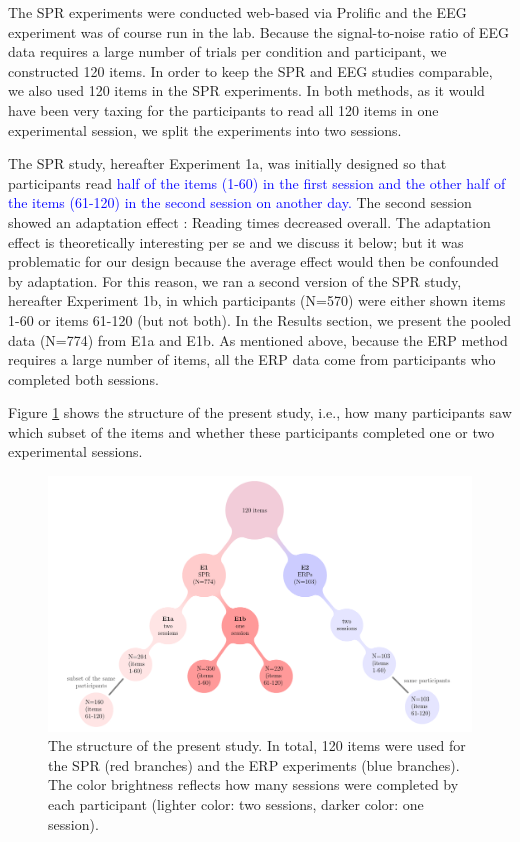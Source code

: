 \documentclass[review,preprint,12pt,authoryear,floatsintext]{elsarticle}
\begin{document}
The SPR experiments were conducted web-based via Prolific and the EEG experiment was of course run in the lab.  Because the signal-to-noise ratio of EEG data requires a large number of trials per condition and participant, we constructed 120 items. In order to keep the SPR and EEG studies comparable, we also used 120 items in the SPR experiments. In both methods, as it would have been very taxing for the participants to read all 120 items in one experimental session, we split the experiments into two sessions. 

The SPR study, hereafter Experiment 1a, was initially designed so that participants read \textcolor{blue}{half of the items (1-60) in the first session and the other half of the items (61-120) in the second session on another day.} The second session showed an adaptation effect \citep{prasad2021rapid}: Reading times decreased overall. The adaptation effect is theoretically interesting per se \citep{fine2013rapid} and we discuss it below; but it was problematic for our design because the average effect would then be confounded by adaptation. For this reason, we ran a second version of the SPR study, hereafter Experiment 1b, in which participants (N=570) were either shown items 1-60 or items 61-120 (but not both). In the Results section, we present the pooled data (N=774) from E1a and E1b.
As mentioned above, because the ERP method requires a large number of items, all the ERP data come from participants who completed both sessions. 

Figure \ref{fig:project_str} shows the structure of the present study, i.e., how many participants saw which subset of the items and whether these participants completed one or two experimental sessions.

\begin{figure}[ht]
    \caption{The structure of the present study. In total, 120 items were used for the SPR (red branches) and the ERP experiments (blue branches). The color brightness reflects how many sessions were completed by each participant (lighter color: two sessions, darker color: one session).}
    \label{fig:project_str}
    \centering
    \includegraphics[width=\textwidth]{pandora_project_structure_figure.pdf}
\end{figure}
\end{document}
